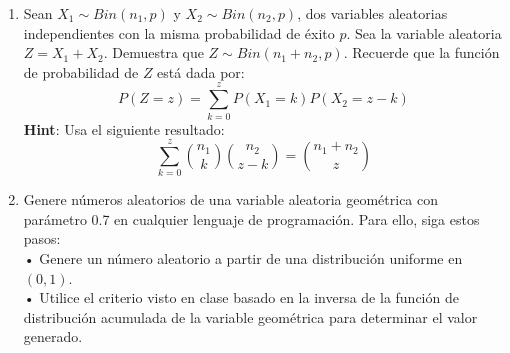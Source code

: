 \documentclass[a4paper, 12pt]{article}
\newcommand{\Pspace}{0.5cm}
\newcommand{\Aspace}{0.2cm}
\begin{document}
\begin{enumerate}
    \item Sean $X_{1} \sim Bin(n_{1}, p)$ y $X_{2} \sim Bin(n_{2}, p)$, dos variables aleatorias independientes con la misma probabilidad de éxito $p$.  
    Sea la variable aleatoria $Z = X_{1} + X_{2}$. Demuestra que $Z \sim Bin(n_{1} + n_{2}, p)$.  
    Recuerde que la función de probabilidad de $Z$ está dada por:
    \[
        P(Z = z) = \sum_{k = 0}^{z} P(X_{1} = k) P(X_{2} = z - k)
    \]
    \textbf{Hint}: Usa el siguiente resultado:
    \[
        \sum_{k = 0}^{z} \binom{n_{1}}{k} \binom{n_{2}}{z - k} = \binom{n_{1} + n_{2}}{z}
    \]
    \vspace{\Aspace} \par
    { \color{azul}  }


    \vspace{\Pspace}
    \item Genere números aleatorios de una variable aleatoria geométrica con parámetro 0.7 en cualquier lenguaje de programación. Para ello, siga estos pasos:
    \vspace{0.2cm}
    \\ • Genere un número aleatorio a partir de una distribución uniforme en $(0, 1)$.
    \\ • Utilice el criterio visto en clase basado en la inversa de la función de distribución acumulada de la variable geométrica para determinar el valor generado.
    \vspace{\Aspace} \par
    { \color{azul}  }
\end{enumerate}
\end{document}
